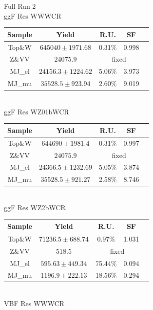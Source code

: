 \begin{table}[ht]
    \centering
     \Large{Full Run 2}\\
     \large{ggF Res WWWCR \\ }
     \begin{tabular}{|c|c|c|c|c|}
      \hline
     Sample    & Yield   & R.U.    & SF    \\ \hline
     Top\&W    & $645040\pm 1971.68$  & 0.31\%  & 0.998  \\ \hline
     Z\&VV     & $24075.9$ & \multicolumn{2}{c|}{fixed} \\ \hline
     MJ\_el    & $24156.3\pm 1224.62$  & 5.06\%  &3.973   \\ \hline
     MJ\_mu    & $35528.5\pm 923.94$  & 2.60\%  &9.019   \\ \hline
     \end{tabular}\hfill%
     \\
     \large{ggF Res WZ01bWCR\\ }
     \begin{tabular}{|c|c|c|c|c|}
      \hline
     Sample    & Yield   & R.U.    & SF    \\ \hline
     Top\&W    & $644690\pm 1981.4$  & 0.31\%  & 0.997  \\ \hline
     Z\&VV     & $24075.9$ & \multicolumn{2}{c|}{fixed} \\ \hline
     MJ\_el    & $24366.5\pm 1232.69$  & 5.05\%  &3.874   \\ \hline
     MJ\_mu    & $35528.5\pm 921.27$  & 2.58\%  &8.746   \\ \hline
     \end{tabular}\hfill%
     \\
     \large{ggF Res WZ2bWCR\\ }
     \begin{tabular}{|c|c|c|c|c|}
      \hline
     Sample    & Yield   & R.U.    & SF    \\ \hline
     Top\&W    & $71236.5\pm 688.74$  & 0.97\%  & 1.031  \\ \hline
     Z\&VV     & $518.5$ & \multicolumn{2}{c|}{fixed} \\ \hline
     MJ\_el    & $595.63\pm 449.34$  & 75.44\%  &0.094   \\ \hline
     MJ\_mu    & $1196.9\pm 222.13$  & 18.56\%  &0.294   \\ \hline
     \end{tabular}\hfill%
     \\
     \large{VBF Res WWWCR\\ }
     \begin{tabular}{|c|c|c|c|c|}

\end{tabular}
\end{table}
